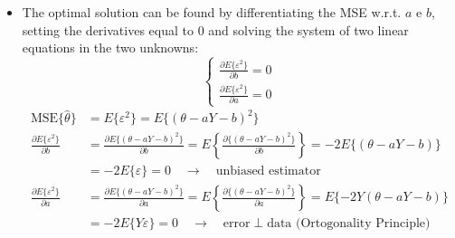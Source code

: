 \begin{itemize}
\begin{align*}
\varepsilon &= \theta - \hat{\theta} = \theta - aY - b \quad \rightarrow \quad \text{MSE}\{\hat{\theta}\} = E\{\varepsilon^2\} = E\{(\theta - aY - b)^2\}
\end{align*}
\item The optimal solution can be found by differentiating the MSE w.r.t. \(a\) e \(b\), setting the derivatives equal to 0 and solving the system of two linear equations in the two unknowns:
\[
\begin{cases}
    \frac{\partial E\{\varepsilon^2\}}{\partial b}=0\\[8pt]
    \frac{\partial E\{\varepsilon ^2\}}{\partial a} =0
\end{cases}
\]
\begin{align*}
\text{MSE}\{\hat{\theta}\} &= E\{\varepsilon^2\} = E\{(\theta - aY - b)^2\} \\[8pt]
\frac{\partial E\{\varepsilon^2\}}{\partial b} &= \frac{\partial E\{(\theta - aY - b)^2\}}{\partial b} = E\left\{\frac{\partial\{(\theta - aY - b)^2\}}{\partial b}\right\} = -2E\{(\theta - aY - b)\} \\[8pt]
&= -2E\{\varepsilon\} = 0 \quad \rightarrow \quad \text{unbiased estimator} \\[8pt]
\frac{\partial E\{\varepsilon^2\}}{\partial a} &= \frac{\partial E\{(\theta - aY - b)^2\}}{\partial a} = E\left\{\frac{\partial\{(\theta - aY - b)^2\}}{\partial a}\right\} = E\{-2Y (\theta - aY - b)\} \\[8pt]
&= -2E\{Y\varepsilon\} = 0 \quad \rightarrow \quad \text{error} \perp \text{data (Ortogonality Principle)}
\end{align*}


\end{itemize}
